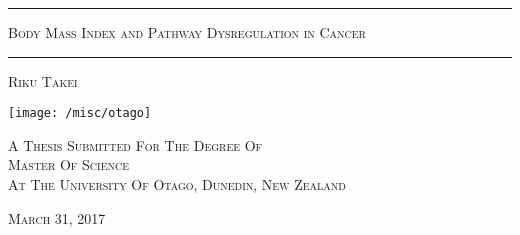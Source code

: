 \begin{titlepage}

\centering

\rule[2.0mm]{\textwidth}{0.5mm}

\begin{doublespace}
    {\Huge \scshape Body Mass Index and Pathway Dysregulation in Cancer}
\end{doublespace}

\rule[2.0mm]{\textwidth}{0.5mm}

\vspace{2.0mm}
{\Large \scshape Riku Takei}

\vfill

\vspace{3cm}

\texttt{[image: /misc/otago]}

\vfill

{\normalsize \scshape A Thesis Submitted For The Degree Of\\}
{\Large \scshape Master Of Science\\}
\vspace{2.0mm}
{\normalsize \scshape At The University Of Otago, Dunedin, New Zealand \\}

\vspace{10.0mm}
{\normalsize \scshape March 31, 2017}

\end{titlepage}
